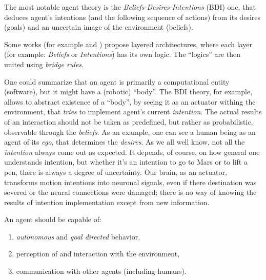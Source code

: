\documentclass[ThesisDoc]{subfiles}
\providecommand{\rootdir}{.}
\begin{document}
The most notable agent theory is the \emph{Beliefs-Desires-Intentions} (BDI) one,
that deduces agent's intentions (and the following sequence of actions)
from its desires (goals) and an uncertain image of the environment (beliefs).


Some works (for example \cite{UAB-Thesis} and \cite{PNoriega}) propose
layered architectures, where each layer (for example: \emph{Beliefs} or \emph{Intentions})
has its own logic. The ``logics'' are then united using \emph{bridge rules}.

\medskip

\noindent
One could summarize that an agent is primarily a computational entity (software),
but it might have a (robotic) ``body''.
The BDI theory, for example, allows to abstract existence of a ``body'',
by seeing it as an actuator withing the environment, that \emph{tries} to
implement agent's current \emph{intention}.
The actual results of an interaction should not be taken as predefined, but rather
as probabilistic, observable through the \emph{beliefs}. As an example, one can
see a human being as an agent of its \emph{ego}, that determines the \emph{desires}.
As we all well know, not all the \emph{intention} always come out as expected.
It depends, of course, on how general one understands intention, but whether
it's an intention to go to Mars or to lift a pen, there is always a degree of
uncertainty. Our brain, as an actuator, transforms motion intentions into
neuronal signals, even if there destination was severed or the neural connections
were damaged; there is no way of knowing the results of intention implementation
except from new information.

\bigskip

\noindent
An agent should be capable of:
\begin{enumerate}
  \item \emph{autonomous} and \emph{goal directed} behavior,
  \item perception of and interaction with the environment,
  \item communication with other agents (including humans).
\end{enumerate}





\end{document}
